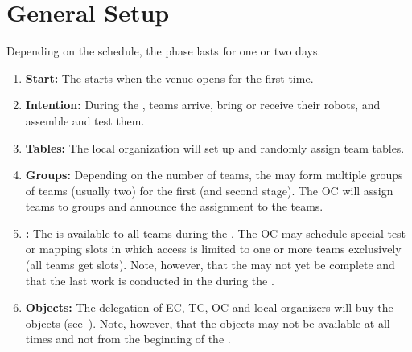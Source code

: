 \section{General Setup}
\label{sec:general_setup}
Depending on the schedule, the  phase lasts for one or two days.

\begin{enumerate}
	\item \textbf{Start:} The  starts when the venue opens for the first time.
	\item \textbf{Intention:} During the , teams arrive, bring or receive their robots, and assemble and test them.
	\item \textbf{Tables:} The local organization will set up and randomly assign team tables.
	\item \textbf{Groups:} Depending on the number of teams, the \OC{} may form multiple groups of teams (usually two) for the first (and second stage). The OC will assign teams to groups and announce the assignment to the teams.
	\item \textbf{\Arena{}:} The \Arena{} is available to all teams during the . The OC may schedule special test or mapping slots in which \Arena{} access is limited to one or more teams exclusively (all teams get slots). Note, however, that the \Arena{} may not yet be complete and that the last work is conducted in the \Arena{} during the \SetupDays.
	\item \textbf{Objects:} The delegation of EC, TC, OC and local organizers will buy the objects (see~). Note, however, that the objects may not be available at all times and not from the beginning of the .
\end{enumerate}

%
%


